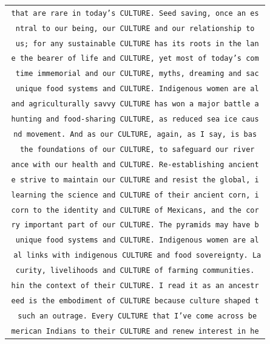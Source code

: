 \begin{table}[h]
\begin{footnotesize}
\centering
\def\arraystretch{1.1}%
 \begin{tabular}{c} 
\texttt{that are rare in today's CULTURE. Seed saving, once an es} \\
\texttt{ntral to our being, our CULTURE and our relationship to} \\
\texttt{ us; for any sustainable CULTURE has its roots in the lan} \\
\texttt{e the bearer of life and CULTURE, yet most of today's com} \\
\texttt{ time immemorial and our CULTURE, myths, dreaming and sac} \\
\texttt{ unique food systems and CULTURE. Indigenous women are al} \\
\texttt{and agriculturally savvy CULTURE has won a major battle a} \\
\texttt{hunting and food-sharing CULTURE, as reduced sea ice caus} \\
\texttt{nd movement. And as our CULTURE, again, as I say, is bas} \\
\texttt{ the foundations of our CULTURE, to safeguard our river} \\ 
\texttt{ance with our health and CULTURE. Re-establishing ancient} \\
\texttt{e strive to maintain our CULTURE and resist the global, i} \\
\texttt{learning the science and CULTURE of their ancient corn, i} \\
\texttt{corn to the identity and CULTURE of Mexicans, and the cor} \\
\texttt{ry important part of our CULTURE. The pyramids may have b} \\
\texttt{ unique food systems and CULTURE. Indigenous women are al} \\
\texttt{\ al links with indigenous CULTURE and food sovereignty. La} \\
\texttt{curity, livelihoods and CULTURE of farming communities.} \\ 
\texttt{hin the context of their CULTURE. I read it as an ancestr} \\
\texttt{eed is the embodiment of CULTURE because culture shaped t} \\
\texttt{\ such an outrage. Every CULTURE that I've come across be} \\
\texttt{merican Indians to their CULTURE and renew interest in he} \\

\end{tabular}
\end{footnotesize}
\end{table}
